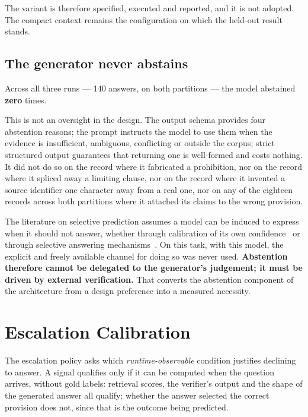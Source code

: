 The variant is therefore specified, executed and reported, and it is not adopted.
The compact context remains the configuration on which the held-out result stands.

\subsection{The generator never abstains}
\label{sec:no-abstention}

Across all three runs --- 140 answers, on both partitions --- the model
abstained \textbf{zero} times.

This is not an oversight in the design. The output schema provides four
abstention reasons; the prompt instructs the model to use them when the evidence
is insufficient, ambiguous, conflicting or outside the corpus; strict structured
output guarantees that returning one is well-formed and costs nothing. It did not do so on the record where it fabricated a prohibition, nor on the
record where it spliced away a limiting clause, nor on the record where it
invented a source identifier one character away from a real one, nor on any of
the eighteen records across both partitions where it attached its claims to the
wrong provision.

The literature on selective prediction assumes a model can be induced to express
when it should not answer, whether through calibration of its own
confidence~\cite{kadavath2022know,jiang2021calibration} or through selective
answering mechanisms~\cite{kamath2020selective,geifman2017selective}. On this
task, with this model, the explicit and freely available channel for doing so was
never used. \textbf{Abstention therefore cannot be delegated to the generator's
judgement; it must be driven by external verification.} That converts the
abstention component of the architecture from a design preference into a measured
necessity.

\section{Escalation Calibration}
\label{sec:escalation}

The escalation policy asks which \emph{runtime-observable} condition justifies
declining to answer. A signal qualifies only if it can be computed when the
question arrives, without gold labels: retrieval scores, the verifier's output
and the shape of the generated answer all qualify; whether the answer selected
the correct provision does not, since that is the outcome being predicted.

